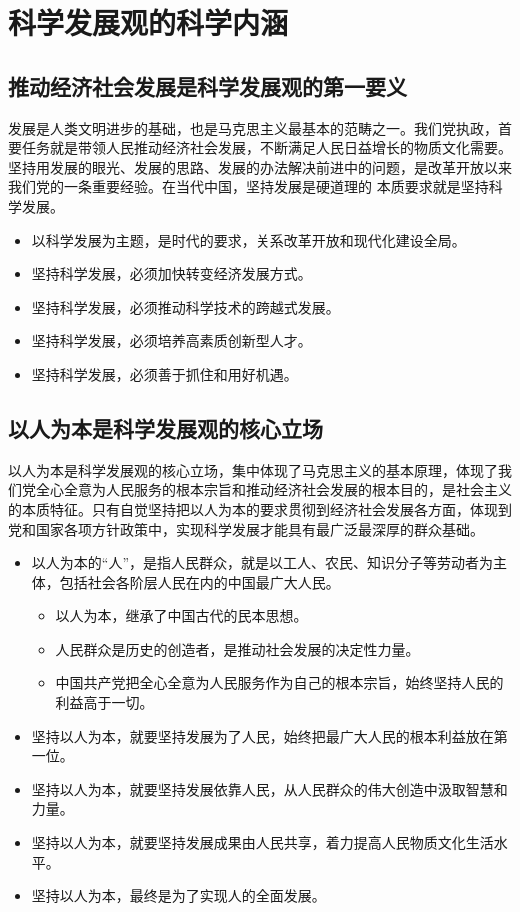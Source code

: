 \documentclass[12pt,openany]{ctexbook}
\begin{document}
\section{科学发展观的科学内涵}
\subsection{推动经济社会发展是科学发展观的第一要义}
发展是人类文明进步的基础，也是马克思主义最基本的范畴之一。我们党执政，首要任务就是带领人民推动经济社会发展，不断满足人民日益增长的物质文化需要。坚持用发展的眼光、发展的思路、发展的办法解决前进中的问题，是改革开放以来我们党的一条重要经验。在当代中国，坚持发展是硬道理的 本质要求就是坚持科学发展。
\begin{itemize}
  \item 以科学发展为主题，是时代的要求，关系改革开放和现代化建设全局。
  \item 坚持科学发展，必须加快转变经济发展方式。
  \item 坚持科学发展，必须推动科学技术的跨越式发展。
  \item 坚持科学发展，必须培养高素质创新型人才。
  \item 坚持科学发展，必须善于抓住和用好机遇。
\end{itemize}
\subsection{以人为本是科学发展观的核心立场}
以人为本是科学发展观的核心立场，集中体现了马克思主义的基本原理，体现了我们党全心全意为人民服务的根本宗旨和推动经济社会发展的根本目的，是社会主义的本质特征。只有自觉坚持把以人为本的要求贯彻到经济社会发展各方面，体现到党和国家各项方针政策中，实现科学发展才能具有最广泛最深厚的群众基础。
\begin{itemize}
  \item 以人为本的“人”，是指人民群众，就是以工人、农民、知识分子等劳动者为主体，包括社会各阶层人民在内的中国最广大人民。
\begin{itemize}
  \item 以人为本，继承了中国古代的民本思想。
  \item 人民群众是历史的创造者，是推动社会发展的决定性力量。
  \item 中国共产党把全心全意为人民服务作为自己的根本宗旨，始终坚持人民的利益高于一切。
\end{itemize}
  \item 坚持以人为本，就要坚持发展为了人民，始终把最广大人民的根本利益放在第一位。
  \item 坚持以人为本，就要坚持发展依靠人民，从人民群众的伟大创造中汲取智慧和力量。
  \item 坚持以人为本，就要坚持发展成果由人民共享，着力提高人民物质文化生活水平。
  \item 坚持以人为本，最终是为了实现人的全面发展。
\end{itemize}
\end{document}

